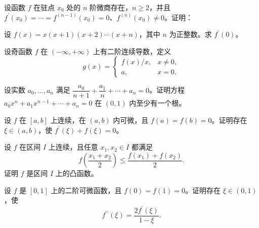 \newpage
\noindent\begin{minipage}{\textwidth}
设函数 $f$ 在驻点 $x_0$ 处的 $n$ 阶微商存在，$n\ge2$，并且 $f^{\prime}(x_0)=\cdots=f^{(n-1)}(x_0)=0$、$f^{(n)}(x_0)\ne0$。证明：
\end{minipage}\par\vfill
\noindent\begin{minipage}{\textwidth}
设 $f(x)=x(x+1)(x+2)\cdots(x+n)$，其中 $n$ 为正整数。求 $f^{\prime}(0)$。
\end{minipage}\par\vfill
\noindent\begin{minipage}{\textwidth}
设奇函数 $f$ 在 $(-\infty,+\infty)$ 上有二阶连续导数，定义\[g(x)=\begin{cases}f(x)/x,&x\ne0,\\a,&x=0.\end{cases}\]
\end{minipage}\par\vfill
\noindent\begin{minipage}{\textwidth}
设实数 $a_0,\ldots,a_n$ 满足 $\dfrac{a_0}{n+1}+\dfrac{a_1}{n}+\cdots+a_n=0$。证明方程 $a_0x^n+a_1x^{n-1}+\cdots+a_n=0$ 在 $(0,1)$ 内至少有一个根。
\end{minipage}\par\vfill
\newpage
\noindent\begin{minipage}{\textwidth}
设 $f$ 在 $[a,b]$ 上连续，在 $(a,b)$ 内可微，且 $f(a)=f(b)=0$。证明存在 $\xi\in(a,b)$，使 $f^{\prime}(\xi)+f(\xi)=0$。
\end{minipage}\par\vfill
\noindent\begin{minipage}{\textwidth}
设 $f$ 在区间 $I$ 上连续，且任意 $x_1,x_2\in I$ 都满足\[f\left(\frac{x_1+x_2}{2}\right)\le\frac{f(x_1)+f(x_2)}2.\]证明 $f$ 是区间 $I$ 上的凸函数。
\end{minipage}\par\vfill
\noindent\begin{minipage}{\textwidth}
设 $f$ 是 $[0,1]$ 上的二阶可微函数，且 $f(0)=f(1)=0$。证明存在 $\xi\in(0,1)$，使\[f^{\prime\prime}(\xi)=\frac{2f^{\prime}(\xi)}{1-\xi}.\]
\end{minipage}\par\vfill
